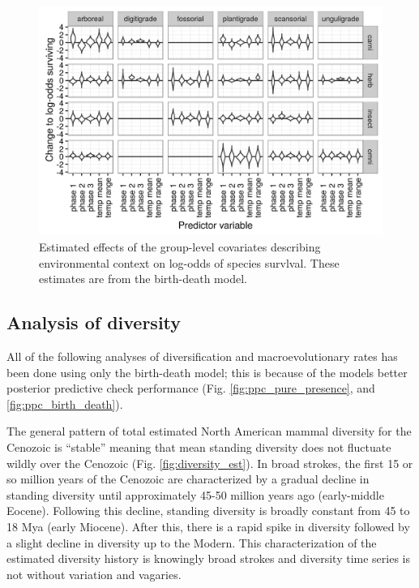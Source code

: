 \documentclass[12pt,letterpaper]{article}
\begin{document}
\begin{figure}[ht]
  \centering
  \includegraphics[width=\textwidth,height=0.5\textheight,keepaspectratio=true]{figure/group_on_survival_bd}
  \caption[Effects of group-level covariates on log-odds of ecotype survival as estimated from the the birth-death model]{Estimated effects of the group-level covariates describing environmental context on log-odds of species survlval. These estimates are from the birth-death model.}
  \label{fig:group_surv_bd}
\end{figure}





\subsection*{Analysis of diversity}

All of the following analyses of diversification and macroevolutionary rates has been done using only the birth-death model; this is because of the models better posterior predictive check performance (Fig. \ref{fig:ppc_pure_presence}, and \ref{fig:ppc_birth_death}). 


The general pattern of total estimated North American mammal diversity for the Cenozoic is ``stable'' meaning that mean standing diversity does not fluctuate wildly over the Cenozoic (Fig. \ref{fig:diversity_est}). In broad strokes, the first 15 or so million years of the Cenozoic are characterized by a gradual decline in standing diversity until approximately 45-50 million years ago (early-middle Eocene). Following this decline, standing diversity is broadly constant from 45 to 18 Mya (early Miocene). After this, there is a rapid spike in diversity followed by a slight decline in diversity up to the Modern. This characterization of the estimated diversity history is knowingly broad strokes and diversity time series is not without variation and vagaries.
\end{document}
